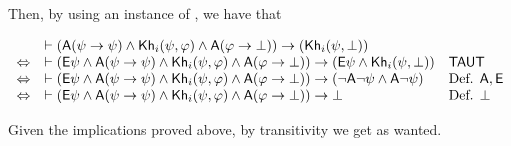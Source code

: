 %
Then, by using an instance of , we have that
\begin{spcenter}
\begin{small}
$\begin{array}{lll}
    & \vdash ({\sf A}(\psi \rightarrow \psi) \wedge {\sf Kh}_i(\psi,\varphi) \wedge {\sf A}(\varphi \rightarrow \bot)) \rightarrow ({\sf Kh}_i(\psi,\bot)) & \\
    \Leftrightarrow &  \vdash ({\sf E}\psi \wedge {\sf A}(\psi \rightarrow \psi) \wedge {\sf Kh}_i(\psi,\varphi) \wedge {\sf A}(\varphi \rightarrow \bot)) \rightarrow ({\sf E}\psi \wedge {\sf Kh}_i(\psi,\bot)) & \textsf{TAUT} \\
    \Leftrightarrow & \vdash ({\sf E}\psi \wedge {\sf A}(\psi \rightarrow \psi) \wedge {\sf Kh}_i(\psi,\varphi) \wedge {\sf A}(\varphi \rightarrow \bot)) \rightarrow (\neg{\sf A}\neg\psi \wedge {\sf A}\neg\psi) & \mbox{Def. } {\sf A},{\sf E} \\
    \Leftrightarrow & \vdash ({\sf E}\psi \wedge {\sf A}(\psi \rightarrow \psi) \wedge {\sf Kh}_i(\psi,\varphi) \wedge {\sf A}(\varphi \rightarrow \bot)) \rightarrow \bot & \mbox{Def. } \bot
\end{array}$
\end{small}
\end{spcenter}
%
%
Given the implications proved above, by transitivity we get  as wanted.

